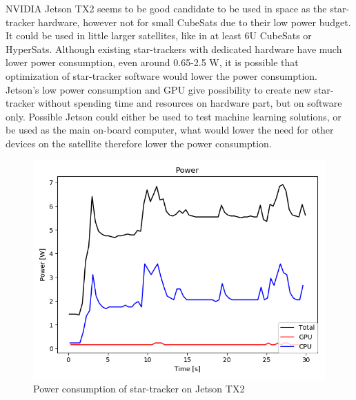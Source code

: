 \documentclass[12pt,a4paper,twoside]{article}
\begin{document}
NVIDIA Jetson TX2 seems to be good candidate to be used in space as the star-tracker hardware, however not for small CubeSats due to their low power budget. It could be used in little larger satellites, like in at least 6U CubeSats or HyperSats. Although existing star-trackers with dedicated hardware have much lower power consumption, even around 0.65-2.5 W, it is possible that optimization of star-tracker software would lower the power consumption. Jetson's low power consumption and GPU give possibility to create new star-tracker without spending time and resources on hardware part, but on software only. Possible Jetson could either be used to test machine learning solutions, or be used as the main on-board computer, what would lower the need for other devices on the satellite therefore lower the power consumption.

\begin{figure}[!htbp]
\includegraphics[scale=0.55]{power_plot.png}
\centering
\caption[Power consumption of star-tracker on Jetson TX2]{Power consumption of star-tracker on Jetson TX2}
\label{fig:power_plot}
\end{figure}
\end{document}
